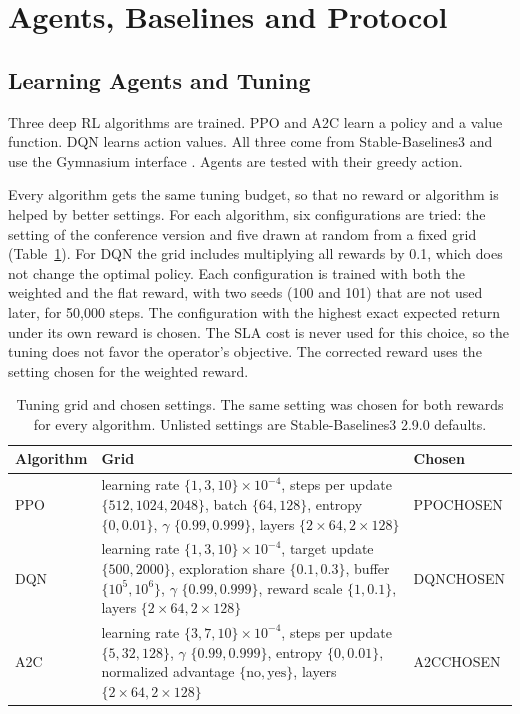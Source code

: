 \section{Agents, Baselines and Protocol}
\label{sec:method}

\subsection{Learning Agents and Tuning}
Three deep RL algorithms are trained. PPO \cite{schulman2017} and A2C \cite{mnih2016} learn a policy and a value function. DQN \cite{mnih2015} learns action values. All three come from Stable-Baselines3 \cite{raffin2021} and use the Gymnasium interface \cite{towers2024}. Agents are tested with their greedy action.

Every algorithm gets the same tuning budget, so that no reward or algorithm is helped by better settings. For each algorithm, six configurations are tried: the setting of the conference version and five drawn at random from a fixed grid (Table~\ref{tab:hyper}). For DQN the grid includes multiplying all rewards by 0.1, which does not change the optimal policy. Each configuration is trained with both the weighted and the flat reward, with two seeds (100 and 101) that are not used later, for 50,000 steps. The configuration with the highest exact expected return under its own reward is chosen. The SLA cost is never used for this choice, so the tuning does not favor the operator's objective. The corrected reward uses the setting chosen for the weighted reward.

\begin{table}[t]
\caption{Tuning grid and chosen settings. The same setting was chosen for both rewards for every algorithm. Unlisted settings are Stable-Baselines3 2.9.0 defaults.}
\label{tab:hyper}
\centering
\footnotesize
\setlength{\tabcolsep}{2.5pt}
\begin{tabular}{@{}l>{\raggedright\arraybackslash}p{3.6cm}l@{}}
\toprule
Algorithm & Grid & Chosen \\
\midrule
PPO & learning rate $\{1,3,10\}\times10^{-4}$, steps per update $\{512, 1024, 2048\}$, batch $\{64,128\}$, entropy $\{0, 0.01\}$, $\gamma$ $\{0.99, 0.999\}$, layers $\{2\times64, 2\times128\}$ & PPOCHOSEN \\
\addlinespace
DQN & learning rate $\{1,3,10\}\times10^{-4}$, target update $\{500, 2000\}$, exploration share $\{0.1,0.3\}$, buffer $\{10^5,10^6\}$, $\gamma$ $\{0.99,0.999\}$, reward scale $\{1, 0.1\}$, layers $\{2\times64, 2\times128\}$ & DQNCHOSEN \\
\addlinespace
A2C & learning rate $\{3,7,10\}\times10^{-4}$, steps per update $\{5, 32, 128\}$, $\gamma$ $\{0.99,0.999\}$, entropy $\{0,0.01\}$, normalized advantage $\{\text{no},\text{yes}\}$, layers $\{2\times64, 2\times128\}$ & A2CCHOSEN \\
\bottomrule
\end{tabular}
\end{table}

